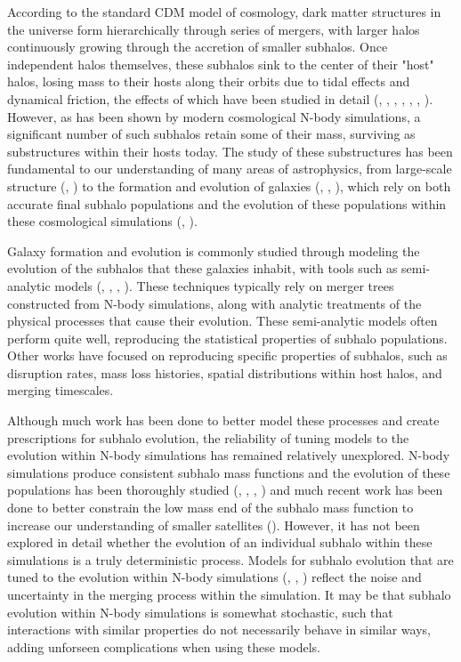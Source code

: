 \documentclass[fleqn,usenatbib]{mnras}
\begin{document}
According to the standard \textLambda CDM model of cosmology, dark matter structures in the universe form hierarchically through series of mergers, with larger halos continuously growing through the accretion of smaller subhalos. Once independent halos themselves, these subhalos sink to the center of their "host" halos, losing mass to their hosts along their orbits due to tidal effects and dynamical friction, the effects of which have been studied in detail (\citet{Tormen1998}, \citet{Weinberg1989}, \citet{Bosch1999}, \citet{Hayashi2003}, \citet{Taffoni2003}, \citet{Gan2010}, \citet{VandenBosch2017}). However, as has been shown by modern cosmological N-body simulations, a significant number of such subhalos retain some of their mass, surviving as substructures within their hosts today. The study of these substructures has been fundamental to our understanding of many areas of astrophysics, from large-scale structure (\citet{Knebe2004}, \citet{Zentner2003}) to the formation and evolution of galaxies (\citet{Hayashi2009}, \citet{Kazantzidis2009}, \citet{Simha2016}), which rely on both accurate final subhalo populations and the evolution of these populations within these cosmological simulations (\citet{Diemand2007}, \citet{Giocoli2007}).

Galaxy formation and evolution is commonly studied through modeling the evolution of the subhalos that these galaxies inhabit, with tools such as semi-analytic models (\citet{Taylor2003}, \citet{Zentner2004}, \citet{Penarrubia2005}, \citet{Jiang2016}). These techniques typically rely on merger trees constructed from N-body simulations, along with analytic treatments of the physical processes that cause their evolution. These semi-analytic models often perform quite well, reproducing the statistical properties of subhalo populations. Other works have focused on reproducing specific properties of subhalos, such as disruption rates, mass loss histories, spatial distributions within host halos, and merging timescales. 

Although much work has been done to better model these processes and create prescriptions for subhalo evolution, the reliability of tuning models to the evolution within N-body simulations has remained relatively unexplored. N-body simulations produce consistent subhalo mass functions and the evolution of these populations has been thoroughly studied (\citet{Gao2004}, \citet{Onions2012}, \citet{Jiang2016a}, \citet{Chua2016}) and much recent work has been done to better constrain the low mass end of the subhalo mass function to increase our understanding of smaller satellites (\citet{Munshi2018}). However, it has not been explored in detail whether the evolution of an individual subhalo within these simulations is a truly deterministic process. Models for subhalo evolution that are tuned to the evolution within N-body simulations (\citet{Penarrubia2005}, \citet{Gan2010}, \citet{Hiroshima2018}) reflect the noise and uncertainty in the merging process within the simulation. It may be that subhalo evolution within N-body simulations is somewhat stochastic, such that interactions with similar properties do not necessarily behave in similar ways, adding unforseen complications when using these models.
\end{document}
